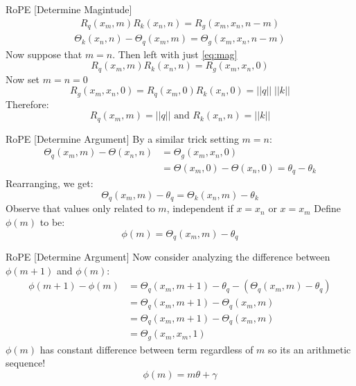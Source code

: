 \documentclass{beamer}
\begin{document}
\begin{frame}[t]{RoPE [Determine Magintude]}
    \vspace{-3em}
    \begin{gather}\label{eq:mag}
        R_q(x_m, m) R_k(x_n, n) = R_g(x_m, x_n, n - m)
    \end{gather}
    \vspace{-3em}
    \begin{gather}\label{eq:arg}
        \Theta_k(x_n, n) - \Theta_q(x_m, m) = \Theta_g(x_m, x_n, n - m)
    \end{gather}
    Now suppose that $m = n$. Then left with just \ref{eq:mag} \newline
    \[R_q(x_m, m) R_k(x_n, n) = R_g(x_m, x_n, 0)\]
    Now set $m = n = 0$
    \[R_g(x_m, x_n, 0) = R_q(x_m, 0) R_k(x_n, 0) = ||q|| \; ||k ||\]
    Therefore:
    \[R_q(x_m, m) = ||q|| \text{ and } R_k(x_n, n) = || k ||\]
\end{frame}

\begin{frame}[t]{RoPE [Determine Argument]}
    By a similar trick setting $m=n$:
    \begin{align}
        \Theta_q(x_m, m) - \Theta(x_n, n) &= \Theta_g(x_m, x_n, 0)\\
        &= \Theta(x_m, 0) - \Theta(x_n, 0) = \theta_q - \theta_k
    \end{align}
    Rearranging, we get:
    \[\Theta_q(x_m, m) - \theta_q = \Theta_k(x_n, m) - \theta_k\]
    Observe that values only related to $m$, independent if $x = x_n$ or $x = x_m$ \newline
    Define $\phi(m)$ to be:
    \[\phi(m) = \Theta_q(x_m, m) - \theta_q\]
\end{frame}

\begin{frame}[t]{RoPE [Determine Argument]}
    Now consider analyzing the difference between $\phi(m + 1)$ and $\phi(m)$:
    \begin{align}
        \phi(m + 1) - \phi(m) &= \Theta_q(x_m, m+1) - \theta_q - (\Theta_q(x_m, m) - \theta_q)\\
                              &= \Theta_q(x_m, m+1) - \Theta_q(x_m, m)\\
                              &= \Theta_q(x_m, m+1) - \Theta_q(x_m, m)\\
                              &= \Theta_g(x_m, x_m, 1)
    \end{align}
    $\phi(m)$ has constant difference between term regardless of $m$ so its an arithmetic sequence!\newline
    \[\phi(m) = m \theta + \gamma\]
\end{frame}
\end{document}
